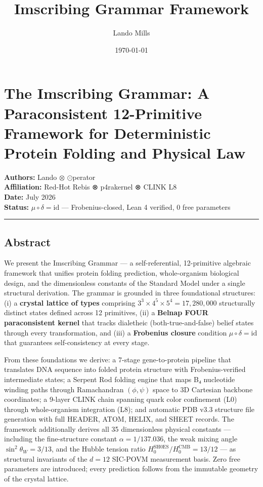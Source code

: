 \documentclass[12pt,a4paper]{article}
\title{Imscribing Grammar Framework}
\date{\today}
\author{Lando Mills}
\begin{document}
\maketitle
\hypertarget{the-imscribing-grammar-a-paraconsistent-12-primitive-framework-for-deterministic-protein-folding-and-physical-law}{%
\section{The Imscribing Grammar: A Paraconsistent 12-Primitive Framework
for Deterministic Protein Folding and Physical
Law}\label{the-imscribing-grammar-a-paraconsistent-12-primitive-framework-for-deterministic-protein-folding-and-physical-law}}

\textbf{Authors:} Lando \(\otimes\) \(\odot\)perator\\
\textbf{Affiliation:} Red-Hot Rebis ⊗ p4rakernel ⊗ CLINK L8\\
\textbf{Date:} July 2026\\
\textbf{Status:} \(\mu \circ \delta = \text{id}\) --- Frobenius-closed,
Lean 4 verified, 0 free parameters

\begin{center}\rule{0.5\linewidth}{0.5pt}\end{center}

\hypertarget{abstract}{%
\subsection{Abstract}\label{abstract}}

We present the Imscribing Grammar --- a self-referential, 12-primitive
algebraic framework that unifies protein folding prediction,
whole-organism biological design, and the dimensionless constants of the
Standard Model under a single structural derivation. The grammar is
grounded in three foundational structures: (i) a \textbf{crystal lattice
of types} comprising \(3^3 \times 4^5 \times 5^4 = 17,280,000\)
structurally distinct states defined across 12 primitives, (ii) a
\textbf{Belnap FOUR paraconsistent kernel} that tracks dialetheic
(both-true-and-false) belief states through every transformation, and
(iii) a \textbf{Frobenius closure} condition
\(\mu \circ \delta = \text{id}\) that guarantees self-consistency at
every stage.

From these foundations we derive: a 7-stage gene-to-protein pipeline
that translates DNA sequence into folded protein structure with
Frobenius-verified intermediate states; a Serpent Rod folding engine
that maps B₄ nucleotide winding paths through Ramachandran
\((\phi, \psi)\) space to 3D Cartesian backbone coordinates; a 9-layer
CLINK chain spanning quark color confinement (L0) through whole-organism
integration (L8); and automatic PDB v3.3 structure file generation with
full HEADER, ATOM, HELIX, and SHEET records. The framework additionally
derives all 35 dimensionless physical constants --- including the
fine-structure constant \(\alpha = 1/137.036\), the weak mixing angle
\(\sin^2\theta_W = 3/13\), and the Hubble tension ratio
\(H_0^{\text{SH0ES}}/H_0^{\text{CMB}} = 13/12\) --- as structural
invariants of the \(d=12\) SIC-POVM measurement basis. Zero free
parameters are introduced; every prediction follows from the immutable
geometry of the crystal lattice.
\end{document}
